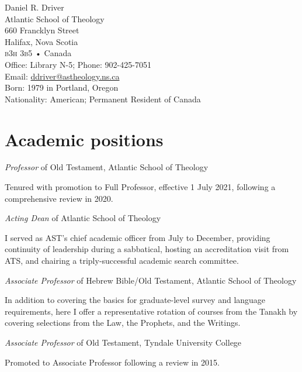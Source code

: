 \documentclass[11pt]{article}
\newcommand{\years}[1]{\marginnote{\footnotesize #1}}
\begin{document}
{\Huge Daniel R. Driver}\\[3em]
%
Atlantic School of Theology\\
660 Francklyn Street\\
Halifax, Nova Scotia\\
\textsc{b3h 3b5} • Canada\\[1em]

%
Office: Library N-5; Phone: 902-425-7051\\
Email: \href{mailto:ddriver@astheology.ns.ca}{ddriver@astheology.ns.ca}\\[1em]
%
Born: 1979 in Portland, Oregon\\
Nationality: American; Permanent Resident of Canada
\vfill

\section*{Academic positions}
\years{2021---} \emph{Professor} of Old Testament, Atlantic School of Theology
	\begin{quoting}
	Tenured with promotion to Full Professor, effective 1 July 2021, following a comprehensive review in 2020.
	\end{quoting}


\years{2020} \emph{Acting Dean} of Atlantic School of Theology
	\begin{quoting}
	I served as AST's chief academic officer from July to December, providing continuity of leadership during a sabbatical, hosting an accreditation visit from ATS, and chairing a triply-successful academic search committee.
	\end{quoting}

\years{2016--2021} \emph{Associate Professor} of Hebrew Bible/Old Testament, Atlantic School of Theology
	\begin{quoting}
	In addition to covering the basics for graduate-level survey and
	language requirements, here I offer a representative rotation of
	courses from the Tanakh by covering selections from the Law, the
	Prophets, and the Writings.
	\end{quoting}

\years{2015--2016} \emph{Associate Professor} of Old Testament, Tyndale University College
	\begin{quoting}
	Promoted to Associate Professor following a review in 2015.
	\end{quoting}
\end{document}
